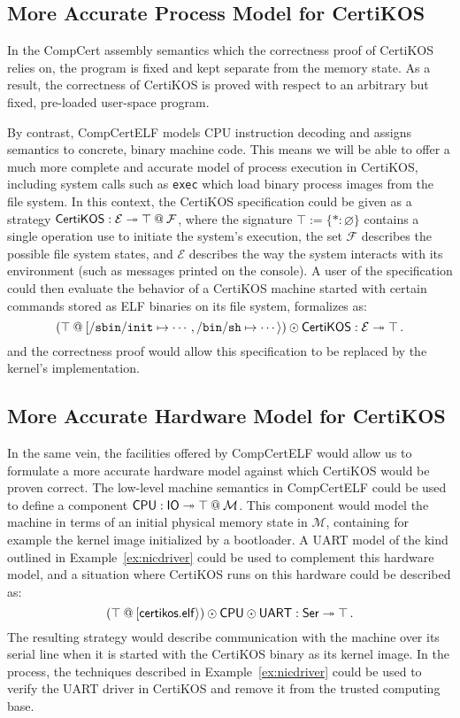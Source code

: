 \subsection{More Accurate Process Model for CertiKOS} \label{sec:userspace}

In the CompCert assembly semantics which
the correctness proof of CertiKOS relies on,
the program is fixed and kept separate from the memory state.
As a result,
the correctness of CertiKOS is proved with respect to
an arbitrary but fixed, pre-loaded user-space program.

By contrast,
CompCertELF models CPU instruction decoding
and assigns semantics to concrete, binary machine code.
This means
we will be able to offer a much more complete and accurate model
of process execution in CertiKOS,
including system calls such as \texttt{exec}
which load binary process images from the file system.
In this context,
the CertiKOS specification could be given as a strategy
$
  \kw{CertiKOS} : \mathcal{E} \twoheadrightarrow \top \mathbin@ \mathcal{F}
$,
where the signature
$\top := \{ * : \varnothing \}$ contains a single operation
use to initiate the system's execution,
the set $\mathcal{F}$ describes the possible file system states,
and $\mathcal{E}$ describes the way the system interacts
with its environment (such as messages printed on the console).
A user of the specification could then
evaluate the behavior of a CertiKOS machine
started with certain commands stored as ELF binaries
on its file system,
formalizes as:
\[
  (\top \mathbin@ [ \mathtt{/sbin/init} \mapsto \cdots,
                   \mathtt{/bin/sh} \mapsto \cdots \rangle)
  \odot \kw{CertiKOS}
  : \mathcal{E} \twoheadrightarrow \top
  \,.
\]
and the correctness proof would allow this specification
to be replaced by the kernel's implementation.

\subsection{More Accurate Hardware Model for CertiKOS} \label{sec:hwm}

In the same vein,
the facilities offered by CompCertELF would allow us to formulate
a more accurate hardware model against which CertiKOS would be proven correct.
The low-level machine semantics in CompCertELF could be used to define
a component
$
  \kw{CPU} : \kw{IO} \twoheadrightarrow \top \mathbin@ \mathcal{M}
$.
This component would model the machine in terms of
an initial physical memory state in $\mathcal{M}$,
containing for example the kernel image initialized by a bootloader.
A UART model of the kind outlined in Example~\ref{ex:nicdriver}
could be used to complement this hardware model,
and a situation where CertiKOS runs on this hardware could be described as:
\[
  (\top \mathbin@ [\kw{certikos.elf}\rangle) \odot 
  \kw{CPU} \odot \kw{UART} : \kw{Ser} \twoheadrightarrow \top
  \,.
\]
The resulting strategy would describe communication with the machine
over its serial line
when it is started with the CertiKOS binary as its kernel image.
In the process,
the techniques described in Example~\ref{ex:nicdriver}
could be used to verify the UART driver in CertiKOS and
remove it from the trusted computing base.

